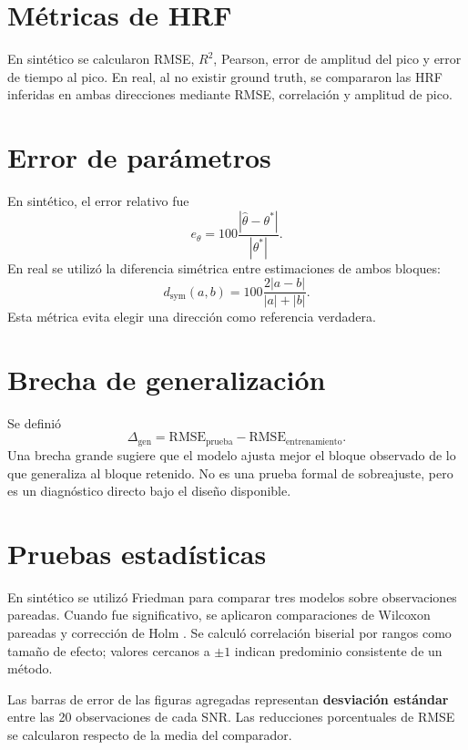 \section{Métricas de HRF}
En sintético se calcularon RMSE, $R^2$, Pearson, error de amplitud del pico y error de tiempo al pico. En real, al no existir ground truth, se compararon las HRF inferidas en ambas direcciones mediante RMSE, correlación y amplitud de pico.

\section{Error de parámetros}
En sintético, el error relativo fue
\begin{equation}
 e_\theta=100\frac{|\hat\theta-\theta^*|}{|\theta^*|}.
\end{equation}
En real se utilizó la diferencia simétrica entre estimaciones de ambos bloques:
\begin{equation}
 d_{\mathrm{sym}}(a,b)=100\frac{2|a-b|}{|a|+|b|}.
\end{equation}
Esta métrica evita elegir una dirección como referencia verdadera.

\section{Brecha de generalización}
Se definió
\begin{equation}
\Delta_{\mathrm{gen}}=\mathrm{RMSE}_{\mathrm{prueba}}-\mathrm{RMSE}_{\mathrm{entrenamiento}}.
\end{equation}
Una brecha grande sugiere que el modelo ajusta mejor el bloque observado de lo que generaliza al bloque retenido. No es una prueba formal de sobreajuste, pero es un diagnóstico directo bajo el diseño disponible.

\section{Pruebas estadísticas}
En sintético se utilizó Friedman para comparar tres modelos sobre observaciones pareadas. Cuando fue significativo, se aplicaron comparaciones de Wilcoxon pareadas y corrección de Holm \citep{Holm1979}. Se calculó correlación biserial por rangos como tamaño de efecto; valores cercanos a $\pm1$ indican predominio consistente de un método.

Las barras de error de las figuras agregadas representan \textbf{desviación estándar} entre las 20 observaciones de cada SNR. Las reducciones porcentuales de RMSE se calcularon respecto de la media del comparador.
